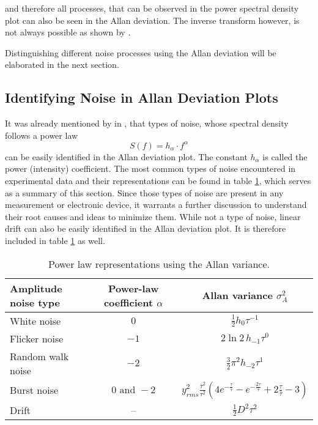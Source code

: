 and therefore all processes, that can be observed in the power spectral density plot can also be seen in the Allan deviation. The inverse transform however, is not always possible as shown by \citeauthor{inverse_adev} \cite{inverse_adev}.

Distinguishing different noise processes using the Allan deviation will be elaborated in the next section.

\subsection{Identifying Noise in Allan Deviation Plots}
It was already mentioned by \citeauthor{adev} in \cite{adev}, that types of noise, whose spectral density follows a power law
\begin{equation}
    S(f) = h_{\alpha} \cdot f^\alpha \label{eqn:power_law}
\end{equation}
can be easily identified in the Allan deviation plot. The constant $h_\alpha$ is called the power (intensity) coefficient. The most common types of noise encountered in experimental data and their representations can be found in table \ref{tab:adev_alpha}, which serves as a summary of this section. Since those types of noise are present in any measurement or electronic device, it warrants a further discussion to understand their root causes and ideas to minimize them. While not a type of noise, linear drift can also be easily identified in the Allan deviation plot. It is therefore included in table \ref{tab:adev_alpha} as well.

\begin{table}[ht]
    \centering
    \begin{tabular}{lcc}
        \toprule
        Amplitude noise type& Power-law coefficient $\alpha$& Allan variance $\sigma_A^2$\\
        \midrule
            White noise & $0$& $\frac 1 2 h_0 \tau^{-1}$ \cite{adev_noise_types}\\
            Flicker noise& $-1$& $2 \ln 2 \, h_{-1} \tau^0$ \cite{adev_noise_types}\\
            Random walk noise& $-2$& $\frac 3 2 \pi^2 h_{-2} \tau^{1}$ \cite{adev_noise_types}\\
            Burst noise& $0 \textrm{ and } -\!2$& $y_{rms}^2\frac{\bar \tau^2}{\tau^2} \left(4 e^{-\frac{\tau}{\bar \tau}} - e^{-\frac{2 \tau}{\bar \tau}} + 2 \frac{\tau}{\bar \tau} - 3 \right)$\\
            Drift & --& $\frac 1 2 D^2 \tau^2$ \cite{adev_drift}\\
        \bottomrule
    \end{tabular}
    \caption{Power law representations using the Allan variance.}
    \label{tab:adev_alpha}
\end{table}

